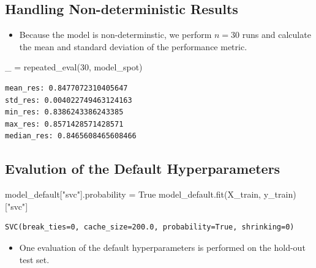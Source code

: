 \documentclass[
  letterpaper,
  DIV=11,
  numbers=noendperiod]{scrreprt}
\newenvironment{Shaded}{\begin{snugshade}}{\end{snugshade}}
\newcommand{\DecValTok}[1]{\textcolor[rgb]{0.68,0.00,0.00}{#1}}
\newcommand{\NormalTok}[1]{\textcolor[rgb]{0.00,0.23,0.31}{#1}}
\newcommand{\OperatorTok}[1]{\textcolor[rgb]{0.37,0.37,0.37}{#1}}
\newcommand{\StringTok}[1]{\textcolor[rgb]{0.13,0.47,0.30}{#1}}
\newcommand{\VariableTok}[1]{\textcolor[rgb]{0.07,0.07,0.07}{#1}}
\providecommand{\tightlist}{%
  \setlength{\itemsep}{0pt}\setlength{\parskip}{0pt}}\usepackage{longtable,booktabs,array}
\begin{document}
\hypertarget{handling-non-deterministic-results-2}{%
\subsection{Handling Non-deterministic
Results}\label{handling-non-deterministic-results-2}}

\begin{itemize}
\tightlist
\item
  Because the model is non-determinstic, we perform \(n=30\) runs and
  calculate the mean and standard deviation of the performance metric.
\end{itemize}

\begin{Shaded}
\begin{Highlighting}[]
\NormalTok{\_ }\OperatorTok{=}\NormalTok{ repeated\_eval(}\DecValTok{30}\NormalTok{, model\_spot)}
\end{Highlighting}
\end{Shaded}

\begin{verbatim}
mean_res: 0.8477072310405647
std_res: 0.004022749463124163
min_res: 0.8386243386243385
max_res: 0.8571428571428571
median_res: 0.8465608465608466
\end{verbatim}

\hypertarget{evalution-of-the-default-hyperparameters-2}{%
\subsection{Evalution of the Default
Hyperparameters}\label{evalution-of-the-default-hyperparameters-2}}

\begin{Shaded}
\begin{Highlighting}[]
\NormalTok{model\_default[}\StringTok{"svc"}\NormalTok{].probability }\OperatorTok{=} \VariableTok{True}
\NormalTok{model\_default.fit(X\_train, y\_train)[}\StringTok{"svc"}\NormalTok{]}
\end{Highlighting}
\end{Shaded}

\begin{verbatim}
SVC(break_ties=0, cache_size=200.0, probability=True, shrinking=0)
\end{verbatim}

\begin{itemize}
\tightlist
\item
  One evaluation of the default hyperparameters is performed on the
  hold-out test set.
\end{itemize}
\end{document}
